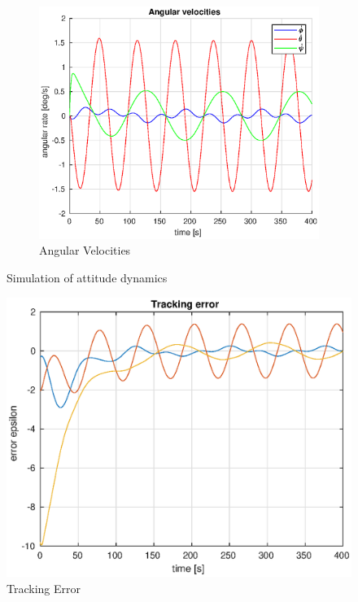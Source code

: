 \begin{figure}[h]
    \begin{subfigure}[b]{0.45\textwidth}
        \includegraphics[width=\textwidth]{plots/angular_velocities_16.eps}
        \caption{Angular Velocities}
        \label{fig:angular6}
    \end{subfigure}
    \caption{Simulation of attitude dynamics}\label{fig:onesix}
\end{figure}

\begin{figure}[h]
    \centering
    \includegraphics{plots/tracking_error_16.eps}
    \caption{Tracking Error}
    \label{fig:trackerr2}
\end{figure}

